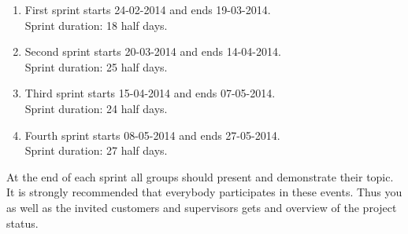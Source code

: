 \begin{enumerate}
\item First sprint starts 24-02-2014 and ends 19-03-2014.\\
Sprint duration: 18 half days.
\item Second sprint starts 20-03-2014 and ends 14-04-2014.\\
Sprint duration: 25 half days.
\item Third sprint starts 15-04-2014 and ends 07-05-2014.\\
Sprint duration: 24 half days.
\item Fourth sprint starts 08-05-2014 and ends 27-05-2014.\\
Sprint duration: 27 half days.
\end{enumerate}

At the end of each sprint all groups should present and demonstrate their topic.
It is strongly recommended that everybody participates in these events. Thus you as well as the invited customers and supervisors gets and overview of the project status.